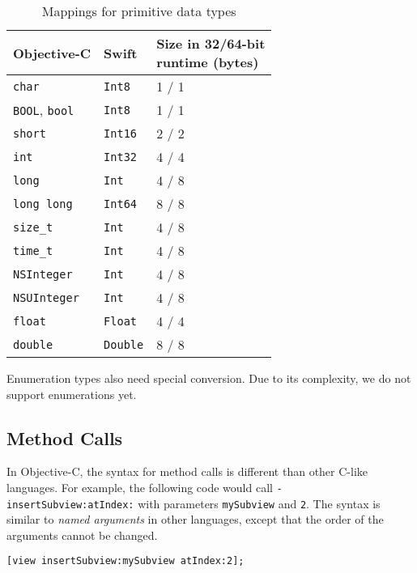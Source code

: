 \documentclass{sfuthesis}
\begin{document}
\begin{table}[H]
\begin{center}
\caption{Mappings for primitive data types}
\begin{tabular}{|l|l|l|}
\hline
{\bf Objective-C \cite{objcdatatypes}} & {\bf Swift \cite{swiftdatatypes}} & \specialcell{{\bf Size in 32/64-bit}\\{\bf runtime (bytes)}} \\
\hline
\texttt{char}       & \texttt{Int8}   & 1 / 1 \\
\texttt{BOOL}, \texttt{bool} & \texttt{Int8}   & 1 / 1 \\
\texttt{short}      & \texttt{Int16}  & 2 / 2 \\
\texttt{int}        & \texttt{Int32}  & 4 / 4 \\
\texttt{long}       & \texttt{Int}    & 4 / 8 \\
\texttt{long long}  & \texttt{Int64}  & 8 / 8 \\
\texttt{size\_t}    & \texttt{Int}    & 4 / 8 \\
\texttt{time\_t}    & \texttt{Int}    & 4 / 8 \\
\texttt{NSInteger}  & \texttt{Int}    & 4 / 8 \\
\texttt{NSUInteger} & \texttt{Int}    & 4 / 8 \\
\texttt{float}      & \texttt{Float}  & 4 / 4 \\
\texttt{double}     & \texttt{Double} & 8 / 8 \\
\hline
\end{tabular}
\end{center}
\end{table}

Enumeration types also need special conversion. Due to its complexity, we do not support enumerations yet.

\subsection{Method Calls}

In Objective-C, the syntax for method calls is different than other C-like languages. For example, the following code would call \texttt{- insertSubview:atIndex:} with parameters \texttt{mySubview} and \texttt{2}. The syntax is similar to \emph{named arguments} in other languages, except that the order of the arguments cannot be changed.

\begin{verbatim}
[view insertSubview:mySubview atIndex:2];
\end{verbatim}
\end{document}
